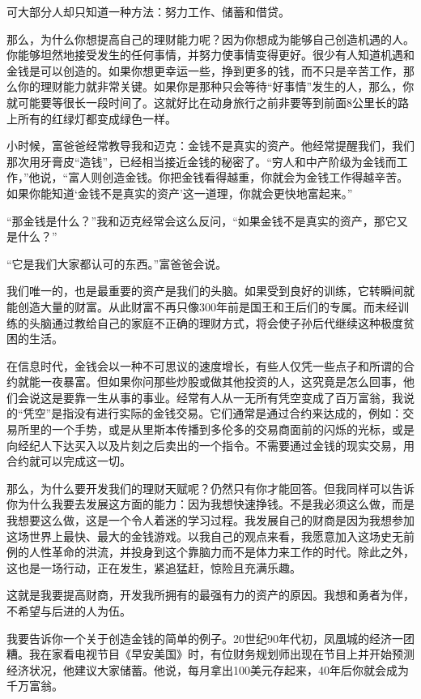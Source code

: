 可大部分人却只知道一种方法：努力工作、储蓄和借贷。

那么，为什么你想提高自己的理财能力呢？因为你想成为能够自己创造机遇的人。你能够坦然地接受发生的任何事情，并努力使事情变得更好。很少有人知道机遇和金钱是可以创造的。如果你想更幸运一些，挣到更多的钱，而不只是辛苦工作，那么你的理财能力就非常关键。如果你是那种只会等待“好事情”发生的人，那么，你就可能要等很长一段时间了。这就好比在动身旅行之前非要等到前面8公里长的路上所有的红绿灯都变成绿色一样。

小时候，富爸爸经常教导我和迈克：金钱不是真实的资产。他经常提醒我们，我们那次用牙膏皮“造钱”，已经相当接近金钱的秘密了。“穷人和中产阶级为金钱而工作，”他说，“富人则创造金钱。你把金钱看得越重，你就会为金钱工作得越辛苦。如果你能知道‘金钱不是真实的资产’这一道理，你就会更快地富起来。”

“那金钱是什么？”我和迈克经常会这么反问，“如果金钱不是真实的资产，那它又是什么？”

“它是我们大家都认可的东西。”富爸爸会说。

我们唯一的，也是最重要的资产是我们的头脑。如果受到良好的训练，它转瞬间就能创造大量的财富。从此财富不再只像300年前是国王和王后们的专属。而未经训练的头脑通过教给自己的家庭不正确的理财方式，将会使子孙后代继续这种极度贫困的生活。

在信息时代，金钱会以一种不可思议的速度增长，有些人仅凭一些点子和所谓的合约就能一夜暴富。但如果你问那些炒股或做其他投资的人，这究竟是怎么回事，他们会说这是要靠一生从事的事业。经常有人从一无所有凭空变成了百万富翁，我说的“凭空”是指没有进行实际的金钱交易。它们通常是通过合约来达成的，例如：交易所里的一个手势，或是从里斯本传播到多伦多的交易商面前的闪烁的光标，或是向经纪人下达买入以及片刻之后卖出的一个指令。不需要通过金钱的现实交易，用合约就可以完成这一切。

那么，为什么要开发我们的理财天赋呢？仍然只有你才能回答。但我同样可以告诉你为什么我要去发展这方面的能力：因为我想快速挣钱。不是我必须这么做，而是我想要这么做，这是一个令人着迷的学习过程。我发展自己的财商是因为我想参加这场世界上最快、最大的金钱游戏。以我自己的观点来看，我愿意加入这场史无前例的人性革命的洪流，并投身到这个靠脑力而不是体力来工作的时代。除此之外，这也是一场行动，正在发生，紧追猛赶，惊险且充满乐趣。

这就是我要提高财商，开发我所拥有的最强有力的资产的原因。我想和勇者为伴，不希望与后进的人为伍。

我要告诉你一个关于创造金钱的简单的例子。20世纪90年代初，凤凰城的经济一团糟。我在家看电视节目《早安美国》时，有位财务规划师出现在节目上并开始预测经济状况，他建议大家储蓄。他说，每月拿出100美元存起来，40年后你就会成为千万富翁。

